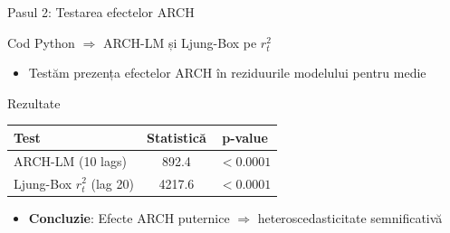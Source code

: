 \documentclass[9pt, aspectratio=169, t]{beamer}
\begin{document}
\begin{frame}{Pasul 2: Testarea efectelor ARCH}
    \small
    \begin{block}{Cod Python $\Rightarrow$ ARCH-LM și Ljung-Box pe $r_t^2$}
        \begin{itemize}
            \item Testăm prezența efectelor ARCH în reziduurile modelului pentru medie
        \end{itemize}
    \end{block}
    \begin{exampleblock}{Rezultate}
        \begin{tabular}{lcc}
            \toprule
            \textbf{Test} & \textbf{Statistică} & \textbf{p-value} \\
            \midrule
            ARCH-LM (10 lags) & 892.4 & $< 0.0001$ \\
            Ljung-Box $r_t^2$ (lag 20) & 4217.6 & $< 0.0001$ \\
            \bottomrule
        \end{tabular}
        \begin{itemize}
            \item \textbf{Concluzie}: Efecte ARCH puternice $\Rightarrow$ heteroscedasticitate semnificativă
        \end{itemize}
    \end{exampleblock}
\end{frame}
\end{document}
